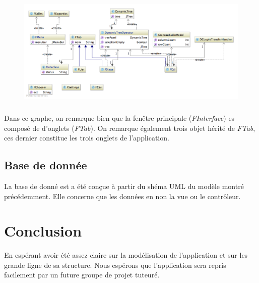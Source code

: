 \documentclass[a4paper,10pt]{report}
\begin{document}
			\begin{figure}[h!]
				\includegraphics[scale=.5]{uml_fen.png}
				\centering
			\end{figure}

			\paragraph*{}
			Dans ce graphe, on remarque bien que la fenêtre principale (\textit{FInterface}) es composé de d’onglets (\textit{FTab}). On remarque également trois objet hérité de \textit{FTab}, ces dernier constitue les trois onglets de l'application.

	\section{Base de donnée}

		La base de donné est a été conçue à partir du shéma UML du modèle montré précédemment. Elle concerne que les données en non la vue ou le contrôleur.

\chapter*{Conclusion}

En espérant avoir été assez claire sur la modélisation de l'application et sur les grande ligne de sa structure. Nous espérons que l'application sera repris facilement par un future groupe de projet tuteuré.
\end{document}
